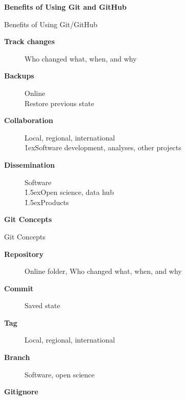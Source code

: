 \documentclass[aspectratio=169]{beamer}
\begin{document}

\begin{frame}\Large
  \centering\darkgreen\bf
  Benefits of Using Git and GitHub
\end{frame}


\begin{frame}{Benefits of Using Git/GitHub}\small
  \begin{description}
    \item[\bf Track changes] Who changed what, when, and why\\[5ex]
    \item[\bf Backups] Online\\[1ex]
    Restore previous state\\[5ex]
    \item[\bf Collaboration] Local, regional, international\\[1ex]
    \h{1ex}Software development, analyses, other projects\\[5ex]
    \item[\bf Dissemination] Software\\[1ex]
    \h{1.5ex}Open science, data hub\\[1ex]
    \h{1.5ex}Products\\[1ex]
  \end{description}
\end{frame}


\begin{frame}\Large
  \centering\darkgreen\bf
  Git Concepts
\end{frame}


\begin{frame}{Git Concepts}\small
  \begin{description}
    \item[\bf Repository] Online folder, Who changed what, when, and why\\[5ex]
    \item[\bf Commit] Saved state\\[5ex]
    \item[\bf Tag] Local, regional, international\\[5ex]
    \item[\bf Branch] Software, open science\\[5ex]
    \item[\bf Gitignore]
  \end{description}
\end{frame}
\end{document}
